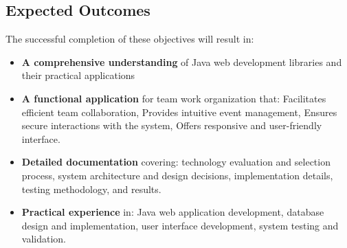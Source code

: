 \subsection{Expected Outcomes}\label{subsec:expected-outcomes}
The successful completion of these objectives will result in:

\begin{itemize}
    \item \textbf{A comprehensive understanding} of Java web development libraries and their practical applications

    \item \textbf{A functional application} for team work organization that:
    Facilitates efficient team collaboration,
    Provides intuitive event management,
    Ensures secure interactions with the system,
    Offers responsive and user-friendly interface.


    \item \textbf{Detailed documentation} covering: technology evaluation and selection process,
    system architecture and design decisions,
    implementation details, testing methodology, and results.


    \item \textbf{Practical experience} in: Java web application development,
    database design and implementation,
    user interface development,
    system testing and validation.
\end{itemize}
